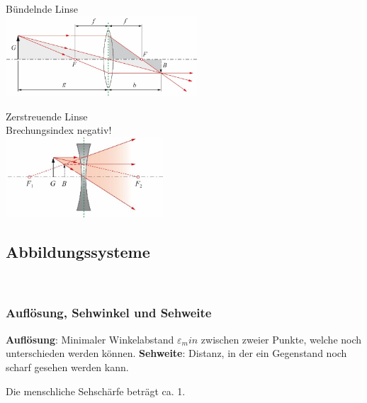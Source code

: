 \begin{center}
	\begin{minipage}{0.3\textwidth}
		Bündelnde Linse \\
		\includegraphics[height=3cm,keepaspectratio=true]{Images/buendelndelinse.png}
	\end{minipage}%
	\begin{minipage}{0.3\textwidth}
		Zerstreuende Linse \\
		Brechungsindex negativ! \\
		\includegraphics[height=3cm,keepaspectratio=true]{Images/streuendelinse.png}
	\end{minipage}
\end{center}

\subsection{Abbildungssysteme}

 \\



\subsubsection{Auflösung, Sehwinkel und Sehweite}

\textbf{Auflösung}: Minimaler Winkelabstand $\varepsilon_min$ zwischen zweier Punkte, welche noch
unterschieden werden können.
\textbf{Sehweite}: Distanz, in der ein Gegenstand noch scharf gesehen werden kann.

Die menschliche Sehschärfe beträgt ca. 1\SIUnitSymbolArcminute.

